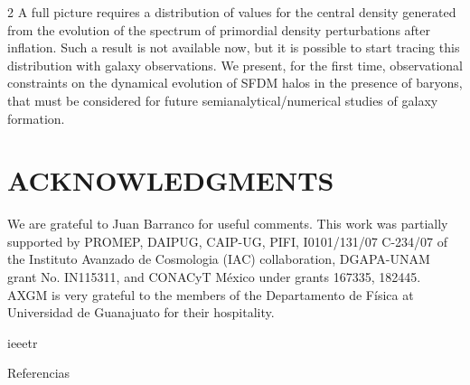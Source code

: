 \documentclass {article}
\begin{document}
\begin{multicols} {2}
A full picture requires a distribution of values for the central density generated from the evolution of the spectrum of primordial density perturbations after inflation. Such a result is not available now, but it is possible to start tracing this distribution with galaxy observations. We present, for the first time, observational constraints on the dynamical evolution of SFDM halos in the presence of baryons, that must be considered for future semianalytical/numerical studies of galaxy formation.


\section* {\normalsize {ACKNOWLEDGMENTS}}


We are grateful to Juan Barranco for useful comments. This work was partially supported by PROMEP, DAIPUG, CAIP-UG, PIFI, I0101/131/07 C-234/07 of the Instituto Avanzado de Cosmologia (IAC) collaboration, DGAPA-UNAM grant No. IN115311, and CONACyT
México under grants 167335, 182445. AXGM is very grateful to the members of the Departamento de Física at Universidad de Guanajuato for their hospitality.

\newpage

 {ieeetr}

 {Referencias}

\end {multicols}
\end{document}
